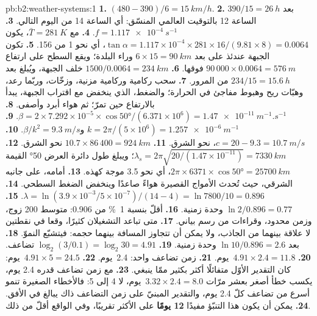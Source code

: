 \begin{solution}{pb:b2:weather-systems:1}
\textbf{1.} $(480 - 390)/6 = \qty{15}{km/h}$.
\textbf{2.} $390/15 = \qty{26}{h}$ بعد الساعة 12 بالتوقيت العالمي المنسّق: أي الساعة 14 من اليوم التالي.
\textbf{3.} $f = \qty{1.117e-4}{s^{-1}}$.
\textbf{4.} مع $\bar T = \qty{281}{K}$، يكون $\tan\alpha = 1.117 \times 10^{-4} \times 281 \times
16/(9.81 \times 8) = 0.0064$، أي نحو 1 من 156.
\textbf{5.} تكون الجبهة عندئذ على بعد $6 \times 15 = \qty{90}{km}$ وراء البلدة؛ ويقع السطح على ارتفاع
$90\,000 \times 0.0064 = \qty{576}{m}$ فوقها.
\textbf{6.} $1500/0.0064 = \qty{234}{km}$ خلف الجبهة، ويُبلغ بعد $234/15 = \qty{15.6}{h}$ من
المرور.
\textbf{7.} سحب ركامية وركامية مزنية، وزخّات، وربّما رعد، وهبّات ريح وهبوط مفاجئ في
الحرارة؛ والضغط، الذي ينخفض مع اقتراب الجبهة، يبدأ بالارتفاع حين تمرّ؛ ثم
هواء أبرد وأصفى.
\textbf{8.} $\beta = 2 \times 7.292 \times 10^{-5} \times \cos\ang{50}/(6.371 \times 10^6) =
\qty{1.47e-11}{m^{-1}.s^{-1}}$.
\textbf{9.} $k = 2\pi/(5 \times 10^6) = \qty{1.257e-6}{m^{-1}}$ و$\beta/k^2 = \qty{9.3}{m/s}$.
\textbf{10.} $c = 20 - 9.3 = \qty{10.7}{m/s}$، نحو الشرق.
\textbf{11.} $10.7 \times 86\,400 = \qty{924}{km}$ نحو الشرق.
\textbf{12.} $\lambda_s = 2\pi\sqrt{20/(1.47 \times 10^{-11})} = \qty{7330}{km}$؛ ويبلغ طول دائرة
العرض \ang{50} القيمة $2\pi \times 6371 \times \cos\ang{50} = \qty{25700}{km}$، أي نحو 3.5
موجة كهذه.
\textbf{13.} أمامه، على جانبه الشرقي، حيث تُحدث الأمواج القصيرة هواءً صاعدًا
وينخفض الضغط السطحي.
\textbf{14.} $\lambda = \ln(3.9 \times 10^{-3}/5 \times 10^{-7})/(14 - 4) = \ln 7800/10 = 0.896$.
\textbf{15.} $\ln 2/0.896 = 0.77$ وحدة زمنية.
\textbf{16.} أقلّ بنسبة \qty{1}{\percent} من 0.906: متوسط 200 زوج، وزمن محدود، وقراءات من
رسم بياني.
\textbf{17.} متى تباعد التشغيلان كثيرًا، وقعا في نقطتين لا علاقة بينهما من الجاذب،
ولا يمكن أن تتجاوز المسافة بينهما حجمه: فيتشبّع النموّ.
\textbf{18.} بعد $\ln 10/0.896 = 2.6$ وحدة زمنية.
\textbf{19.} $\log_2(3/0.1) = \log_2 30 = 4.91$ تضاعف.
\textbf{20.} $4.91 \times 2.4 = 11.8$~يوم.
\textbf{21.} زمن تضاعف واحد: 2.4~يوم.
\textbf{22.} $4.91 \times 5 = 24.5$~يوم: كان التقدير الأوّل متفائلًا أكثر بكثير ممّا ينبغي.
\textbf{23.} مع زمن تضاعف قدره 2.4 يوم، يكسب خطأ أصغر بعشر مرّات $3.32 \times 2.4
= 8.0$~يوم، لا 4 إلى 5: فالأخطاء الصغيرة تنمو أسرع من تضاعف كلّ 2.4 يوم، والتقدير
المبنيّ على زمن التضاعف ذاك يبالغ في الأفق.
\textbf{24.} يمكن أن يكون هذا التنبّؤ مفيدًا \textbf{12 يومًا} على الأكثر تقريبًا، وفي الواقع
أقلّ من ذلك.
\end{solution}
